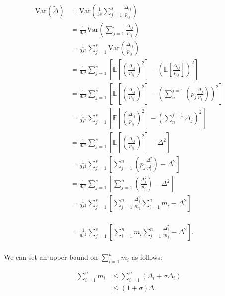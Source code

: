 \documentclass[11pt, margin=1in]{article}
\begin{document}
\[
\begin{aligned}
\mathrm{Var}\left(\tilde{\Delta}\right) &= \mathrm{Var} \left( \frac{1}{3s} \sum_{j = 1}^{s} \frac{\Delta_{ij}}{p_{ij}} \right) \\
&= \frac{1}{9s^2} \mathrm{Var} \left( \sum_{j = 1}^{s} \frac{\Delta_{ij}}{p_{ij}} \right) \\
&= \frac{1}{9s^2} \sum_{j = 1}^{s} \mathrm{Var} \left( \frac{\Delta_{ij}}{p_{ij}} \right) \\
&= \frac{1}{9s^2} \sum_{j = 1}^{s} \left[\mathbb{E}\left[\left(\frac{\Delta_{ij}}{p_{ij}}\right)^2\right] - \left(\mathbb{E}\left[\frac{\Delta_{ij}}{p_{ij}}\right]\right)^2\right] \\
&= \frac{1}{9s^2} \sum_{j = 1}^{s} \left[\mathbb{E}\left[\left(\frac{\Delta_{ij}}{p_{ij}}\right)^2\right] - \left(\sum_{n}^{j=1}\left(p_j \frac{\Delta_j}{p_j}\right)\right)^2\right] \\
&= \frac{1}{9s^2} \sum_{j = 1}^{s} \left[\mathbb{E}\left[\left(\frac{\Delta_{ij}}{p_{ij}}\right)^2\right] - \left(\sum_{n}^{j=1}\Delta_j\right)^2\right] \\
&= \frac{1}{9s^2} \sum_{j = 1}^{s} \left[\mathbb{E}\left[\left(\frac{\Delta_{ij}}{p_{ij}}\right)^2\right] - \Delta^2\right] \\
&= \frac{1}{9s^2} \sum_{j = 1}^{s} \left[\sum_{j = 1}^{n}\left(p_j \frac{\Delta_j^2}{p_j^2}\right) - \Delta^2\right] \\
&= \frac{1}{9s^2} \sum_{j = 1}^{s} \left[\sum_{j = 1}^{n}\left(\frac{\Delta_j^2}{p_j}\right) - \Delta^2\right] \\
&= \frac{1}{9s^2} \sum_{j = 1}^{s} \left[\sum_{j = 1}^{n}\frac{\Delta_j^2}{m_j} \sum_{i = 1}^{n}m_i - \Delta^2\right] \\
\end{aligned}
\]

\[
\begin{aligned}
&= \frac{1}{9s^2} \sum_{j = 1}^{s} \left[\sum_{i = 1}^{n}m_i \sum_{j = 1}^{n}\frac{\Delta_j^2}{m_j} - \Delta^2\right]. \\
\end{aligned}
\]

We can set an upper bound on $\sum_{i = 1}^{n}m_i$ as follows:

\[
\begin{aligned}
\sum_{i = 1}^{n}m_i &\leq \sum_{i = 1}^{n}\left(\Delta_i + \sigma \Delta_i\right) \\
&\leq \left(1 + \sigma\right) \Delta. \\
\end{aligned}
\]
\end{document}
